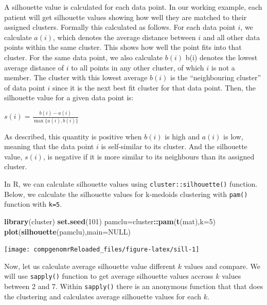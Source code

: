 \documentclass[12pt,]{krantz}
\newenvironment{Shaded}{\begin{snugshade}}{\end{snugshade}}
\newcommand{\DataTypeTok}[1]{\textcolor[rgb]{0.13,0.29,0.53}{#1}}
\newcommand{\DecValTok}[1]{\textcolor[rgb]{0.00,0.00,0.81}{#1}}
\newcommand{\KeywordTok}[1]{\textcolor[rgb]{0.13,0.29,0.53}{\textbf{#1}}}
\newcommand{\NormalTok}[1]{#1}
\newcommand{\OperatorTok}[1]{\textcolor[rgb]{0.81,0.36,0.00}{\textbf{#1}}}
\newcommand{\OtherTok}[1]{\textcolor[rgb]{0.56,0.35,0.01}{#1}}
\begin{document}
A silhouette value is calculated for each data point. In our working example, each patient will get silhouette values showing how well they are matched to their assigned clusters. Formally this calculated as follows. For each data point \(i\), we calculate \({\displaystyle a(i)}\), which denotes the average distance between \(i\) and all other data points within the same cluster. This shows how well the point fits into that cluster. For the same data point, we also calculate \({\displaystyle b(i)}\) b(i) denotes the lowest average distance of \({\displaystyle i}\) to all points in any other cluster, of which \({\displaystyle i}\) is not a member. The cluster with this lowest average \(b(i)\) is the ``neighbouring cluster'' of data point \({\displaystyle i}\) since it is the next best fit cluster for that data point. Then, the silhouette value for a given data point is:

\(s(i) = \frac{b(i) - a(i)}{\max\{a(i),b(i)\}}\)

As described, this quantity is positive when \(b(i)\) is high and \(a(i)\) is low, meaning that the data point \(i\) is self-similar to its cluster. And the silhouette value, \(s(i)\), is negative if it is more similar to its neighbours than its assigned cluster.

In R, we can calculate silhouette values using \texttt{cluster::silhouette()} function. Below, we calculate the silhouette values for k-medoids clustering with \texttt{pam()} function with \texttt{k=5}.

\begin{Shaded}
\begin{Highlighting}[]
\KeywordTok{library}\NormalTok{(cluster)}
\KeywordTok{set.seed}\NormalTok{(}\DecValTok{101}\NormalTok{)}
\NormalTok{pamclu=cluster}\OperatorTok{::}\KeywordTok{pam}\NormalTok{(}\KeywordTok{t}\NormalTok{(mat),}\DataTypeTok{k=}\DecValTok{5}\NormalTok{)}
\KeywordTok{plot}\NormalTok{(}\KeywordTok{silhouette}\NormalTok{(pamclu),}\DataTypeTok{main=}\OtherTok{NULL}\NormalTok{)}
\end{Highlighting}
\end{Shaded}

\begin{center}\texttt{[image: compgenomrReloaded\_files/figure-latex/sill-1]} \end{center}

Now, let us calculate average silhouette value different \(k\) values and compare. We will use \texttt{sapply()} function to get average silhouette values accross \(k\) values between 2 and 7. Within \texttt{sapply()} there is an anonymous function that that does the clustering and calculates average silhouette values for each \(k\).
\end{document}
